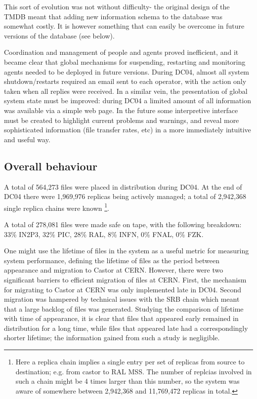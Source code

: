 \documentclass{cmspaper}
\begin{document}
This sort of evolution was not without difficulty- the original design
of the TMDB meant that adding new information schema to the database
was somewhat costly. It is however something that can easily be
overcome in future versions of the database (see below).

Coordination and management of people and agents proved inefficient,
and it became clear that global mechanisms for suspending, restarting
and monitoring agents needed to be deployed in future versions. During
DC04, almost all system shutdown/restarts required an email sent to
each operator, with the action only taken when all replies were
received. In a similar vein, the presentation of global system state
must be improved: during DC04 a limited amount of all information was
available via a simple web page. In the future some interpretive
interface must be created to highlight current problems and warnings,
and reveal more sophisticated information (file transfer rates, etc)
in a more immediately intuitive and useful way.

\subsection{Overall behaviour}
A total of 564,273 files were placed in distribution during DC04. At
the end of DC04 there were 1,969,976 replicas being actively managed;
a total of 2,942,368 single replica chains were known \footnote{Here a
replica chain implies a single entry per set of replicas from source
to destination; e.g. from castor to RAL MSS. The number of replcias
involved in such a chain might be 4 times larger than this number, so
the system was aware of somewhere between 2,942,368 and 11,769,472
replicas in total.}.

A total of 278,081 files were made safe on tape, with the following
breakdown: 33\% IN2P3, 32\% PIC, 28\% RAL, 8\% INFN, 0\% FNAL, 0\%
FZK.

One might use the lifetime of files in the system as a useful metric
for measuring system performance, defining the lifetime of files as
the period between appearance and migration to Castor at
CERN. However, there were two significant barriers to efficient
migration of files at CERN. First, the mechanism for migrating to
Castor at CERN was only implemented late in DC04. Second migration was
hampered by technical issues with the SRB chain which meant that a
large backlog of files was generated. Studying the comparison of
lifetime with time of appearance, it is clear that files that appeared
early remained in distribution for a long time, while files that
appeared late had a correspondingly shorter lifetime; the information
gained from such a study is negligible.
\end{document}
